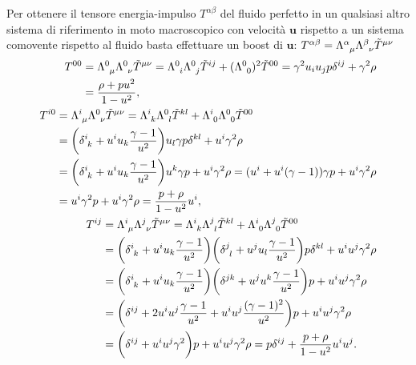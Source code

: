 Per ottenere il tensore energia-impulso $T^{\alpha\beta}$ del fluido perfetto in
un qualsiasi altro sistema di riferimento in moto macroscopico con velocità
$\bm{u}$ rispetto a un sistema comovente rispetto al fluido basta effettuare un
boost di $\bm{u}$:
$T^{\alpha\beta} =
\tensor{\Lambda}{^{\alpha}_{\mu}}\tensor{\Lambda}{^{\beta}_{\nu}}\tilde
T^{\mu\nu}$
\begin{subequations}
  \allowdisplaybreaks{}
  \begin{align}
    \begin{split}
      T^{00} &= \tensor{\Lambda}{^{0}_{\mu}} \tensor{\Lambda}{^{0}_{\nu}} \tilde
      T^{\mu\nu} = \tensor{\Lambda}{^{0}_{i}} \tensor{\Lambda}{^{0}_{j}} \tilde
      T^{ij} + (\tensor{\Lambda}{^{0}_{0}})^{2} \tilde{T}^{00} = \gamma^{2} u_{i}
      u_{j} p \delta^{ij} + \gamma^{2} \rho \\
      &= \frac{\rho +pu^{2}}{1-u^{2}},
    \end{split} \\
    \begin{split}
      T^{i0} &= \tensor{\Lambda}{^{i}_{\mu}} \tensor{\Lambda}{^{0}_{\nu}} \tilde
      T^{\mu\nu} = \tensor{\Lambda}{^{i}_{k}} \tensor{\Lambda}{^{0}_{l}} \tilde
      T^{kl} + \tensor{\Lambda}{^{i}_{0}} \tensor{\Lambda}{^{0}_{0}} \tilde
      T^{00} \\
      &= \bigg(\tensor{\delta}{^{i}_{k}} + u^{i}u_{k}\frac{\gamma -
        1}{u^{2}}\bigg) u_{l} \gamma p \delta^{kl} + u^{i} \gamma^{2} \rho \\
      &= \bigg(\tensor{\delta}{^{i}_{k}} + u^{i}u_{k}\frac{\gamma -
        1}{u^{2}}\bigg) u^{k} \gamma p + u^{i} \gamma^{2} \rho = (u^{i} +
      u^{i}(\gamma - 1)) \gamma p + u^{i} \gamma^{2} \rho \\
      &= u^{i}\gamma^{2} p + u^{i} \gamma^{2} \rho = \frac{p + \rho}{1 -
        u^{2}}u^{i},
    \end{split} \\
    \begin{split}
      T^{ij} &= \tensor{\Lambda}{^{i}_{\mu}} \tensor{\Lambda}{^{j}_{\nu}} \tilde
      T^{\mu\nu} = \tensor{\Lambda}{^{i}_{k}} \tensor{\Lambda}{^{j}_{l}} \tilde
      T^{kl} + \tensor{\Lambda}{^{i}_{0}} \tensor{\Lambda}{^{j}_{0}} \tilde
      T^{00} \\
      &= \bigg(\tensor{\delta}{^{i}_{k}} + u^{i}u_{k}\frac{\gamma -
        1}{u^{2}}\bigg) \bigg(\tensor{\delta}{^{j}_{l}} + u^{j}u_{l}\frac{\gamma
        - 1}{u^{2}}\bigg) p \delta^{kl} + u^{i}u^{j} \gamma^{2} \rho \\
      &= \bigg(\tensor{\delta}{^{i}_{k}} + u^{i}u_{k}\frac{\gamma -
        1}{u^{2}}\bigg) \bigg(\delta^{jk} + u^{j}u^{k}\frac{\gamma -
        1}{u^{2}}\bigg) p + u^{i}u^{j} \gamma^{2} \rho \\
      &= \bigg(\delta^{ij} + 2 u^{i}u^{j} \frac{\gamma - 1}{u^{2}} +
      u^{i}u^{j}\frac{(\gamma - 1)^{2}}{u^{2}}\bigg)p + u^{i}u^{j} \gamma^{2}
      \rho \\
      &= \bigg(\delta^{ij} + u^{i}u^{j}\gamma^{2}\bigg)p + u^{i}u^{j} \gamma^{2}
      \rho = p \delta^{ij} + \frac{p + \rho}{1 - u^{2}}u^{i}u^{j}.
    \end{split}
  \end{align}
\end{subequations}
